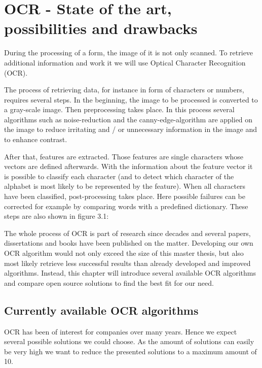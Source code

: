 %
% 

\label{OCR}
\chapter{OCR - State of the art, possibilities and drawbacks}

During the processing of a form, the image of it is not only scanned. To retrieve additional information and work it we will use Optical Character Recognition (OCR).

The process of retrieving data, for instance in form of characters or numbers, requires several steps. In the beginning, the image to be processed is converted to a gray-scale image. Then preprocessing takes place. In this process several algorithms such as noise-reduction and the canny-edge-algorithm are applied on the image to reduce irritating and / or unnecessary information in the image and to enhance contrast.

After that, features are extracted. Those features are single characters whose vectors are defined afterwards. With the information about the feature vector it is possible to classify each character (and to detect which character of the alphabet is most likely to be represented by the feature).
When all characters have been classified, post-processing takes place. Here possible failures can be corrected for example by comparing words with a predefined dictionary.
These steps are also shown in figure 3.1:

The whole process of OCR is part of research since decades and several papers, dissertations and books have been published on the matter. Developing our own OCR algorithm would not only exceed the size of this master thesis, but also most likely retrieve less successful results than already developed and improved algorithms. Instead, this chapter will introduce several available OCR algorithms and compare open source solutions to find the best fit for our need.

\label{CurrAvailOCRAlgorithms}
\section{Currently available OCR algorithms}

OCR has been of interest for companies over many years. Hence we expect several possible solutions we could choose. As the amount of solutions can easily be very high we want to reduce the presented solutions to a maximum amount of 10.

